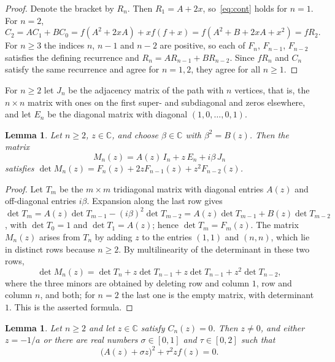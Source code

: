 \documentclass{amsart}
\newtheorem{lemma}[theorem]{Lemma}
\theoremstyle{remark}
\numberwithin{equation}{section}
\newcommand{\C}{\mathbb{C}}
\begin{document}
\begin{proof}
Denote the bracket by $R_n$. Then $R_1=A+2x$, so~\eqref{eq:cont} holds for
$n=1$. For $n=2$,
\[
C_2=AC_1+BC_0=f(A^2+2xA)+xf(f+x)=f(A^2+B+2xA+x^2)=fR_2 .
\]
For $n\ge 3$ the indices $n$, $n-1$ and $n-2$ are positive, so each of
$F_n$, $F_{n-1}$, $F_{n-2}$ satisfies the defining recurrence and
$R_n=AR_{n-1}+BR_{n-2}$. Since $fR_n$ and $C_n$ satisfy the same recurrence
and agree for $n=1,2$, they agree for all $n\ge 1$.
\end{proof}

For $n\ge 2$ let $J_n$ be the adjacency matrix of the path with $n$ vertices,
that is, the $n\times n$ matrix with ones on the first super- and
subdiagonal and zeros elsewhere, and let $E_n$ be the diagonal matrix with
diagonal $(1,0,\dots,0,1)$.

\begin{lemma}\label{lem:det}
Let $n\ge 2$, $z\in\C$, and choose $\beta\in\C$ with $\beta^2=B(z)$. Then
the matrix
\[
M_n(z)=A(z)\,I_n+z\,E_n+i\beta\,J_n
\]
satisfies
$\det M_n(z)=F_n(z)+2zF_{n-1}(z)+z^2F_{n-2}(z)$.
\end{lemma}

\begin{proof}
Let $T_m$ be the $m\times m$ tridiagonal matrix with diagonal entries $A(z)$
and off-diagonal entries $i\beta$. Expansion along the last row gives
$\det T_m=A(z)\det T_{m-1}-(i\beta)^2\det T_{m-2}
=A(z)\det T_{m-1}+B(z)\det T_{m-2}$, with $\det T_0=1$ and
$\det T_1=A(z)$; hence $\det T_m=F_m(z)$. The matrix $M_n(z)$ arises from
$T_n$ by adding $z$ to the entries $(1,1)$ and $(n,n)$, which lie in
distinct rows because $n\ge 2$. By multilinearity of the determinant in
these two rows,
\[
\det M_n(z)=\det T_n+z\det T_{n-1}+z\det T_{n-1}+z^2\det T_{n-2},
\]
where the three minors are obtained by deleting row and column $1$, row and
column $n$, and both; for $n=2$ the last one is the empty matrix, with
determinant $1$. This is the asserted formula.
\end{proof}

\begin{lemma}\label{lem:reduction}
Let $n\ge 2$ and let $z\in\C$ satisfy $C_n(z)=0$. Then $z\ne 0$, and either
$z=-1/a$ or there are real numbers $\sigma\in[0,1]$ and $\tau\in[0,2]$ such
that
\begin{equation}\label{eq:quartic-z}
\bigl(A(z)+\sigma z\bigr)^2+\tau^2 z f(z)=0 .
\end{equation}
\end{lemma}
\end{document}
